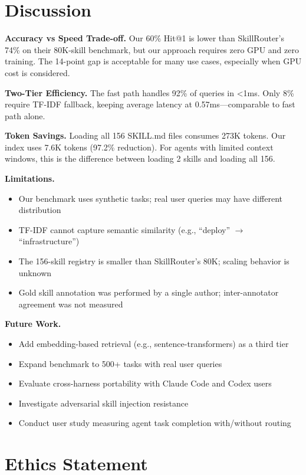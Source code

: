 \documentclass[11pt]{article}
\begin{document}
\section{Discussion}

\textbf{Accuracy vs Speed Trade-off.} Our 60\% Hit@1 is lower than SkillRouter's 74\% on their 80K-skill benchmark, but our approach requires zero GPU and zero training. The 14-point gap is acceptable for many use cases, especially when GPU cost is considered.

\textbf{Two-Tier Efficiency.} The fast path handles 92\% of queries in <1ms. Only 8\% require TF-IDF fallback, keeping average latency at 0.57ms---comparable to fast path alone.

\textbf{Token Savings.} Loading all 156 SKILL.md files consumes 273K tokens. Our index uses 7.6K tokens (97.2\% reduction). For agents with limited context windows, this is the difference between loading 2 skills and loading all 156.

\textbf{Limitations.}
\begin{itemize}
  \item Our benchmark uses synthetic tasks; real user queries may have different distribution
  \item TF-IDF cannot capture semantic similarity (e.g., ``deploy'' $\to$ ``infrastructure'')
  \item The 156-skill registry is smaller than SkillRouter's 80K; scaling behavior is unknown
  \item Gold skill annotation was performed by a single author; inter-annotator agreement was not measured
\end{itemize}

\textbf{Future Work.}
\begin{itemize}
  \item Add embedding-based retrieval (e.g., sentence-transformers) as a third tier
  \item Expand benchmark to 500+ tasks with real user queries
  \item Evaluate cross-harness portability with Claude Code and Codex users
  \item Investigate adversarial skill injection resistance
  \item Conduct user study measuring agent task completion with/without routing
\end{itemize}

\section{Ethics Statement}
\end{document}

